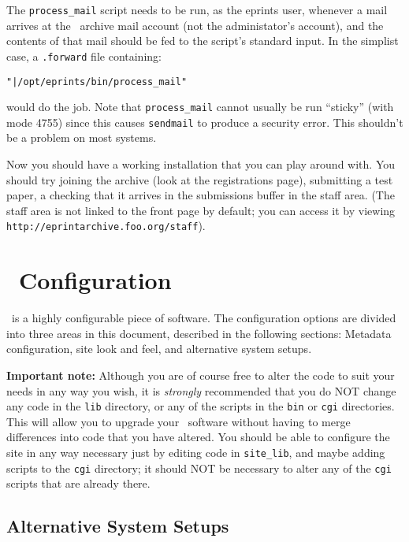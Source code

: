 The {\tt process\_mail} script needs to be run, as the eprints user, whenever a mail arrives at the \eprints\ archive mail account (not the administator's account), and the contents of that mail should be fed to the script's standard input. In the simplist case, a {\tt .forward} file containing:

\begin{verbatim}
"|/opt/eprints/bin/process_mail"
\end{verbatim}

would do the job. Note that {\tt process\_mail} cannot usually be run ``sticky'' (with mode 4755) since this causes {\tt sendmail} to produce a security error. This shouldn't be a problem on most systems.

Now you should have a working installation that you can play around with. You should try joining the archive (look at the registrations page), submitting a test paper, a checking that it arrives in the submissions buffer in the staff area. (The staff area is not linked to the front page by default; you can access it by viewing {\tt http://eprintarchive.foo.org/staff}).


\section{\eprints\ Configuration}
\label{install_configure}

\eprints\ is a highly configurable piece of software. The configuration options are divided into three areas in this document, described in the following sections: Metadata configuration, site look and feel, and alternative system setups.

{\bf Important note:} Although you are of course free to alter the code to suit your needs in any way you wish, it is \emph{strongly} recommended that you do NOT change any code in the {\tt lib} directory, or any of the scripts in the {\tt bin} or {\tt cgi} directories. This will allow you to upgrade your \eprints\ software without having to merge differences into code that you have altered. You should be able to configure the site in any way necessary just by editing code in {\tt site\_lib}, and maybe adding scripts to the {\tt cgi} directory; it should NOT be necessary to alter any of the {\tt cgi} scripts that are already there.


\subsection{Alternative System Setups}
\label{install_alternative}

